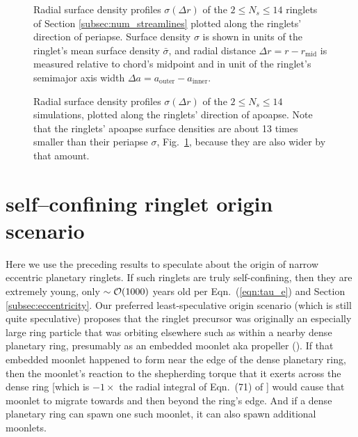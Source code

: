 \documentclass[preprint]{aastex62}
\begin{document}
\begin{figure}
    \caption{
        \label{fig:periapse_sigma_vs_r_streamlines.pdf}
        Radial surface density profiles $\sigma(\Delta r)$ 
        of the $2\le N_s\le14$ ringlets of Section \ref{subsec:num_streamlines}
        plotted along the ringlets' direction of periapse.
        Surface density $\sigma$ is shown in units of the ringlet's mean surface density $\bar{\sigma}$,
        and radial distance $\Delta r = r - r_{\text{mid}}$ is measured relative to chord's midpoint
        and in unit of the ringlet's semimajor axis width $\Delta a=a_{\text{outer}}-a_{\text{inner}}$. 
    }
\end{figure}
\begin{figure}
    \caption{
        \label{fig:apoapse_sigma_vs_r_streamlines.pdf}
        Radial surface density profiles $\sigma(\Delta r)$ 
        of the $2\le N_s\le14$ simulations, plotted along the ringlets' direction of apoapse.
        Note that the ringlets' apoapse surface densities are about 13 times smaller
        than their periapse $\sigma$, Fig.\ \ref{fig:periapse_sigma_vs_r_streamlines.pdf},
        because they are also wider by that amount.
    }
\end{figure}

\section{self--confining ringlet origin scenario}
\label{sec:origin}

Here we use the preceding results to speculate about the origin of narrow eccentric planetary ringlets.
If such ringlets are truly self-confining, then they are extremely young, only $\sim{\cal O}(1000)$ years 
old per Eqn.\ (\ref{eqn:tau_e}) and Section \ref{subsec:eccentricity}. Our preferred least-speculative origin scenario 
(which is still quite speculative) proposes that
the ringlet precursor was originally an especially large ring particle that was orbiting elsewhere such as
within a nearby dense planetary ring, presumably as an embedded moonlet aka propeller (\citealt{Tetal10}). 
If that embedded moonlet happened to 
form near the edge of the dense planetary ring, then the moonlet's reaction to
the shepherding torque that it exerts across the dense ring [which is $-1\times$ 
the radial integral of Eqn.\ (71) of \cite{GT82}] would
cause that moonlet to migrate towards and then beyond the ring's edge. And if a dense planetary ring can spawn
one such moonlet, it can also spawn additional moonlets. 
\end{document}
